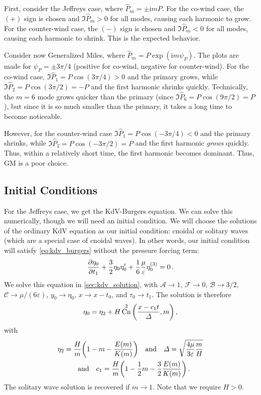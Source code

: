 \documentclass{jfm}
\let\Oldsubsection\subsection
\renewcommand{\subsection}{\FloatBarrier\Oldsubsection}
\newcommand{\GenP}{\hat{P}_m}
\newcommand{\POne}{\hat{P}_1}
\newcommand{\PTwo}{\hat{P}_2}
\DeclareMathOperator{\cn}{Cn}
\newcommand{\im}{\mathrm{i}}
\renewcommand*{\epsilon}{\varepsilon}
\begin{document}
First, consider the Jeffreys case, where $\GenP = \pm \im m P$.
For the co-wind case, the $(+)$ sign is chosen and $\Im{\GenP} > 0$ for
all modes, causing each harmonic to grow.
For the counter-wind case, the $(-)$ sign is chosen and $\Im{\GenP} < 0$
for all modes, causing each harmonic to shrink.
This is the expected behavior.

Consider now Generalized Miles, where $\GenP = P \exp(\im m \psi_P)$.
The plots are made for $\psi_P = \pm 3\pi/4$ (positive for
co-wind, negative for counter-wind).
For the co-wind case, $\Im{\POne} = P \cos(3\pi/4) > 0$ and the primary
grows, while $\Im{\PTwo} = P \cos(3\pi/2) = -P$ and the first harmonic
shrinks quickly.
Technically, the $m=6$ mode grows quicker than the primary (since
$\Im{\hat{P}_6} = P \cos(9\pi/2) = P$), but since it is so much smaller
than the primary, it takes a long time to become noticeable.

However, for the counter-wind case $\Im{\POne} = P \cos(-3\pi/4) < 0$ and the primary
shrinks, while $\Im{\PTwo} = P \cos(-3\pi/2) = P$ and the first harmonic
\emph{grows} quickly.
Thus, within a relatively short time, the first harmonic becomes
dominant.
Thus, GM is a poor choice.

\subsection{Initial Conditions}
For the Jeffreys case, we get the KdV-Burgers equation.
We can solve this numerically, though we will need an initial condition.
We will choose the solutions of the ordinary KdV equation as our initial
condition: cnoidal or solitary waves (which are a special case of
cnoidal waves).
In other words, our initial condition will satisfy \cref{eq:kdv_burgers}
without the pressure forcing term:
\begin{equation}
   \pdv{\eta_0}{t_1} + \frac{3}{2} \eta_0 \eta_0' + \frac{1}{6}
   \frac{\mu}{\epsilon} \eta_0^{(3)} = 0 \,.
\end{equation}
We solve this equation in \cref{sec:kdv_solution}, with $\mathcal{A} \to
1$, $\mathcal{F} \to 0$, $\mathcal{B} \to 3/2$, $\mathcal{C} \to \mu/(6
\epsilon)$, $y_0 \to \eta_0$, $x \to x - t_0$, and $\tau_0 \to t_1$.
The solution is therefore
\begin{equation}
  \eta_0 = \eta_2 + H \cn^2\pqty{\frac{x-c_1 t}{\Delta} , m} \,,
\end{equation}
with
\begin{gather}
  \eta_2 = \frac{H}{m} \pqty{1 - m - \frac{E(m)}{K(m)}}
  \qq{and}
  \Delta = \sqrt{\frac{4 \mu}{3 \epsilon} \frac{m}{H}}
  \\
  \qq{and}
  c_1 = \frac{H}{m} \pqty{1 - \frac{1}{2} m - \frac{3}{2}
    \frac{E(m)}{K(m)}} \,.
\end{gather}
The solitary wave solution is recovered if $m \to 1$.
Note that we require $H > 0$.
\end{document}
